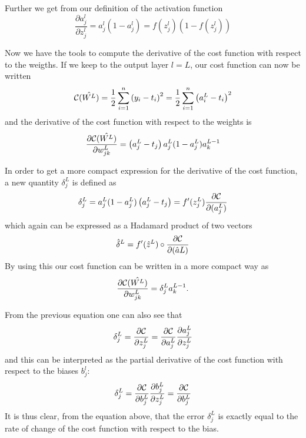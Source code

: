 \documentclass[a4paper,12pt]{article}
\begin{document}
Further we get from our definition of the activation function
\begin{equation}
    \frac{\partial a_j^l}{\partial z_j^{l}} = a_j^l(1-a_j^l)=f(z_j^l)(1-f(z_j^l))
\end{equation}

Now we have the tools to compute the derivative of the cost function with respect to the weigths. If we keep to the output layer $l=L$, our cost function can now be written
\begin{equation}
    {\cal C}(\hat{W^L})  =  \frac{1}{2}\sum_{i=1}^n\left(y_i - t_i\right)^2=\frac{1}{2}\sum_{i=1}^n\left(a_i^L - t_i\right)^2
\end{equation}
and the derivative of the cost function with respect to the weights is
\begin{equation}
    \frac{\partial{\cal C}(\hat{W^L})}{\partial w_{jk}^L}  =  \left(a_j^L - t_j\right)a_j^L(1-a_j^L)a_k^{L-1}
\end{equation}

In order to get a more compact expression for the derivative of the cost function, a new quantity $\delta_j^L$ is defined as
\begin{equation}
    \delta_j^L = a_j^L(1-a_j^L)\left(a_j^L - t_j\right) = f'(z_j^L)\frac{\partial {\cal C}}{\partial (a_j^L)}
\end{equation}
which again can be expressed as a Hadamard product of two vectors
\begin{equation}
    \hat{\delta}^L = f'(\hat{z}^L)\circ\frac{\partial {\cal C}}{\partial (\hat{a}L)}
\end{equation}
By using this our cost function can be written in a more compact way as
\begin{equation}
    \frac{\partial{\cal C}(\hat{W^L})}{\partial w_{jk}^L}  =  \delta_j^La_k^{L-1}.
\end{equation}

From the previous equation one can also see that
\begin{equation}
    \delta_j^L =\frac{\partial {\cal C}}{\partial z_j^L}= \frac{\partial {\cal C}}{\partial a_j^L}\frac{\partial a_j^L}{\partial z_j^L}
\end{equation}
and this can be interpreted as the partial derivative of the cost function with respect to the biases $b_j^l$:
\begin{equation}
    \delta_j^L = \frac{\partial {\cal C}}{\partial b_j^L}\frac{\partial b_j^L}{\partial z_j^L}=\frac{\partial {\cal C}}{\partial b_j^L}
\end{equation}
It is thus clear, from the equation above, that the error $\delta_j^L$ is exactly equal to the rate of change of the cost function with respect to the bias.\newline
\end{document}
